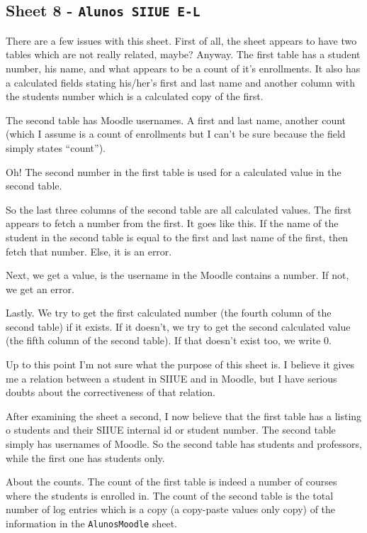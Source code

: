 \subsection{Sheet 8 - \texttt{Alunos SIIUE E-L}}

There are a few issues with this sheet. First of all, the sheet appears to have
two tables which are not really related, maybe? Anyway. The first table has a
student number, his name, and what appears to be a count of it's enrollments.
It also has a calculated fields stating his/her's first and last name and
another column with the students number which is a calculated copy of the
first.

The second table has Moodle usernames. A first and last name, another count
(which I assume is a count of enrollments but I can't be sure because the field
simply states ``count'').

Oh! The second number in the first table is used for a calculated value in the
second table.

So the last three columns of the second table are all calculated values. The
first appears to fetch a number from the first. It goes like this. If the name
of the student in the second table is equal to the first and last name of the
first, then fetch that number. Else, it is an error.

Next, we get a value, is the username in the Moodle contains a number. If not,
we get an error.

Lastly. We try to get the first calculated number (the fourth column of the
second table) if it exists. If it doesn't, we try to get the second calculated
value (the fifth column of the second table). If that doesn't exist too, we
write 0.

Up to this point I'm not sure what the purpose of this sheet is. I believe it
gives me a relation between a student in SIIUE and in Moodle, but I have
serious doubts about the correctiveness of that relation.

After examining the sheet a second, I now believe that the first table has a
listing o students and their SIIUE internal id or student number. The second
table simply has usernames of Moodle. So the second table has students and
professors, while the first one has students only.

About the counts. The count of the first table is indeed a number of courses
where the students is enrolled in. The count of the second table is the total
number of log entries which is a copy (a copy-paste values only copy) of the
information in the \texttt{AlunosMoodle} sheet.

